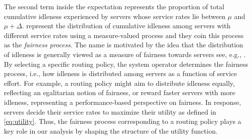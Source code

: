 \documentclass[a4paper,11pt,twoside]{article}
\numberwithin{equation}{section}
\numberwithin{figure}{section}
\theoremstyle{plain}
\newcommand{\1}{\mathbbm{1}}
\begin{document}
The second term inside the expectation represents the proportion of total cumulative idleness experienced by servers whose service rates lie between $\mu$ and $\mu + \Delta$. \cite{bukeqin2019} represent the distribution of cumulative idleness among servers with different service rates using a measure-valued process and they coin this process as the \emph{fairness process}. 
The name is motivated by the idea that the distribution of idleness is generally viewed as a measure of fairness towards servers see, e.g., \cites{armward10, wararm13}. By selecting a specific routing policy, the system operator determines the fairness process, i.e.,  how idleness is distributed among servers as a function of service effort. For example, a routing policy might aim to distribute idleness equally, reflecting an egalitarian notion of fairness, or reward faster servers with more idleness, representing a performance-based perspective on fairness. In response, servers decide their service rates to maximize their utility as defined in \eqref{eq:utility}. Thus, the fairness process corresponding to a routing policy plays a key role in our analysis by shaping the structure of the utility function.



\end{document}
